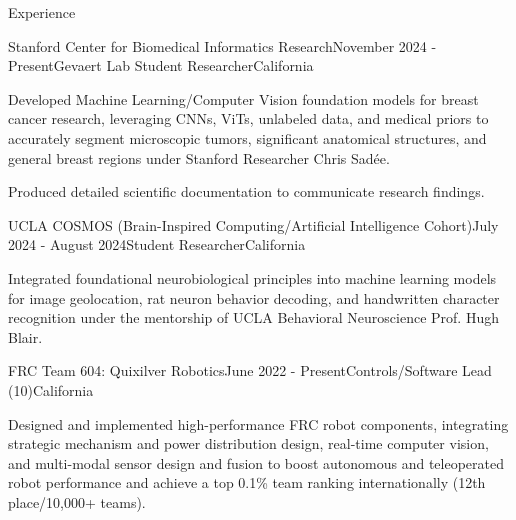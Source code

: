 \documentclass[
  10pt, %
]{resume}
\begin{document}
\sloppy


\begin{rSection}{Experience}


  \begin{rSubsection}{Stanford Center for Biomedical Informatics Research}{November 2024 - Present}{Gevaert Lab Student Researcher}{California}
    
    \item Developed Machine Learning/Computer Vision foundation models for breast cancer research, leveraging CNNs, ViTs, unlabeled data, and medical priors to accurately segment microscopic tumors, significant anatomical structures, and general breast regions under Stanford Researcher Chris Sadée.
    
    \item Produced detailed scientific documentation to communicate research findings.
    
  \end{rSubsection}
        
  \begin{rSubsection}{UCLA COSMOS (Brain-Inspired Computing/Artificial Intelligence Cohort)}{July 2024 - August 2024}{Student Researcher}{California}
    
    \item Integrated foundational neurobiological principles into machine learning models for image geolocation, rat neuron behavior decoding, and handwritten character recognition under the mentorship of UCLA Behavioral Neuroscience Prof. Hugh Blair.
    
  \end{rSubsection}
        
  \begin{rSubsection}{FRC Team 604: Quixilver Robotics}{June 2022 - Present}{Controls/Software Lead (10)}{California}
    
    \item Designed and implemented high-performance FRC robot components, integrating strategic mechanism and power distribution design, real-time computer vision, and multi-modal sensor design and fusion to boost autonomous and teleoperated robot performance and achieve a top 0.1\% team ranking internationally (12th place/10,000+ teams).
    

\end{rSubsection}
\end{rSection}
\end{document}
